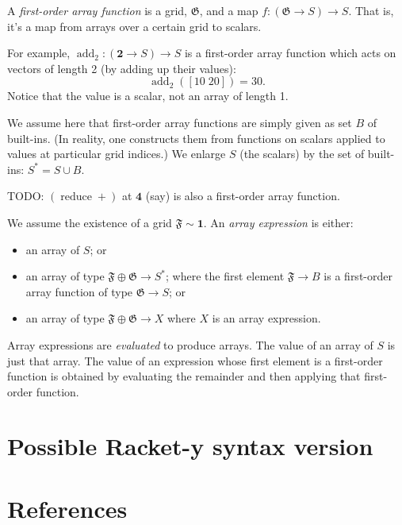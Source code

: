 \documentclass[11pt]{article}
\newcommand{\gr}[1]{\mathfrak{#1}}
\newcommand{\unit}{\mathbf{1}}
\DeclareMathOperator{\reduce}{reduce}
\begin{document}
A \emph{first-order array function} is a grid, \(\gr{G}\), and a map \(f: (\gr{G}\to
S)\to S\). That is, it's a map from arrays over a certain grid to scalars. 

For example, \(\operatorname{add}_2 : (\mathbf{2}\to S)\to S\) is a first-order
array function which acts on vectors of length 2 (by adding up their values):
$$
\operatorname{add}_2([10\; 20]) = 30.
$$ 
Notice that the value is a scalar, not an array of length 1.

We assume here that first-order array functions are simply given as set \(B\) of
built-ins.  (In reality, one constructs them from functions on scalars applied
to values at particular grid indices.) We enlarge \(S\) (the scalars) by the set
of built-ins: \(S^* = S\cup B\).

TODO: \((\reduce +)\) at \(\mathbf{4}\) (say) is also a first-order array function.  

We assume the existence of a grid \(\gr{F}\sim\unit\). An \emph{array expression} is
either:
\begin{itemize}
\item an array of \(S\); or
\item an array of type \(\gr{F}\oplus\gr{G}\to S^*\); where the first element
\(\gr{F}\to B\) is a first-order array function of type \(\gr{G}\to S\); or
\item an array of type \(\gr{F}\oplus\gr{G}\to X\) where \(X\) is an array expression.
\end{itemize}

Array expressions are \emph{evaluated} to produce arrays. The value of an array of
\(S\) is just that array. The value of an expression whose first element is a
first-order function is obtained by evaluating the remainder and then applying
that first-order function.

\section{Possible Racket-y syntax version}
\label{sec:orga1852e4}


\section{References}
\label{sec:orgbf56ab8}

\label{org334ac2d}


\label{orgefbceba}

\end{document}
